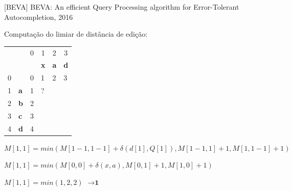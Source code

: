 \documentclass[11pt]{beamer}
\begin{document}
\begin{frame}{[BEVA] BEVA: An efficient Query Processing algorithm for Error-Tolerant Autocompletion, 2016}

    Computação do limiar de distância de edição:
  
    \begin{table}[]
    \begin{tabular}{llllll}
     &  & \multicolumn{1}{c}{{\color[HTML]{656565} 0}} & \multicolumn{1}{c}{{\color[HTML]{656565} 1}} & \multicolumn{1}{c}{{\color[HTML]{656565} 2}} & \multicolumn{1}{c}{{\color[HTML]{656565} 3}} \\
     &  &  & \textbf{x} & \textbf{a} & \textbf{d} \\ \cline{3-6} 
    {\color[HTML]{656565} 0} & \multicolumn{1}{l|}{} & \multicolumn{1}{l|}{{\color[HTML]{000000} 0}} & \multicolumn{1}{l|}{{\color[HTML]{000000} 1}} & \multicolumn{1}{l|}{{\color[HTML]{000000} 2}} & \multicolumn{1}{l|}{{\color[HTML]{000000} 3}} \\ \cline{3-6} 
    {\color[HTML]{656565} 1} & \multicolumn{1}{l|}{\textbf{a}} & \multicolumn{1}{l|}{{\color[HTML]{000000} 1}} & \multicolumn{1}{l|}{{\color[HTML]{000000} ?}} & \multicolumn{1}{l|}{{\color[HTML]{000000} }} & \multicolumn{1}{l|}{{\color[HTML]{000000} }} \\ \cline{3-6} 
    {\color[HTML]{656565} 2} & \multicolumn{1}{l|}{\textbf{b}} & \multicolumn{1}{c|}{{\color[HTML]{000000} 2}} & \multicolumn{1}{c|}{{\color[HTML]{000000} }} & \multicolumn{1}{c|}{{\color[HTML]{000000} }} & \multicolumn{1}{c|}{{\color[HTML]{000000} }} \\ \cline{3-6} 
    {\color[HTML]{656565} 3} & \multicolumn{1}{l|}{\textbf{c}} & \multicolumn{1}{l|}{{\color[HTML]{000000} 3}} & \multicolumn{1}{l|}{{\color[HTML]{000000} }} & \multicolumn{1}{l|}{{\color[HTML]{000000} }} & \multicolumn{1}{l|}{{\color[HTML]{000000} }} \\ \cline{3-6} 
    {\color[HTML]{656565} 4} & \multicolumn{1}{l|}{\textbf{d}} & \multicolumn{1}{c|}{{\color[HTML]{000000} 4}} & \multicolumn{1}{c|}{{\color[HTML]{000000} }} & \multicolumn{1}{c|}{{\color[HTML]{000000} }} & \multicolumn{1}{c|}{{\color[HTML]{000000} }} \\ \cline{3-6} 
    \end{tabular}
    \end{table}
    
    \small
    $M[1, 1] = min(M[1 - 1, 1 - 1] + \delta(d[1], Q[1]), M[1 - 1, 1] + 1, M[1, 1 - 1] + 1)$ \pause
    
    $M[1, 1] = min(M[0, 0] + \delta(x, a), M[0, 1] + 1, M[1, 0] + 1)$ \pause
    
    $M[1, 1] = min(1, 2, 2)$ \pause $\to \textbf{1}$
    
\end{frame}
\end{document}
